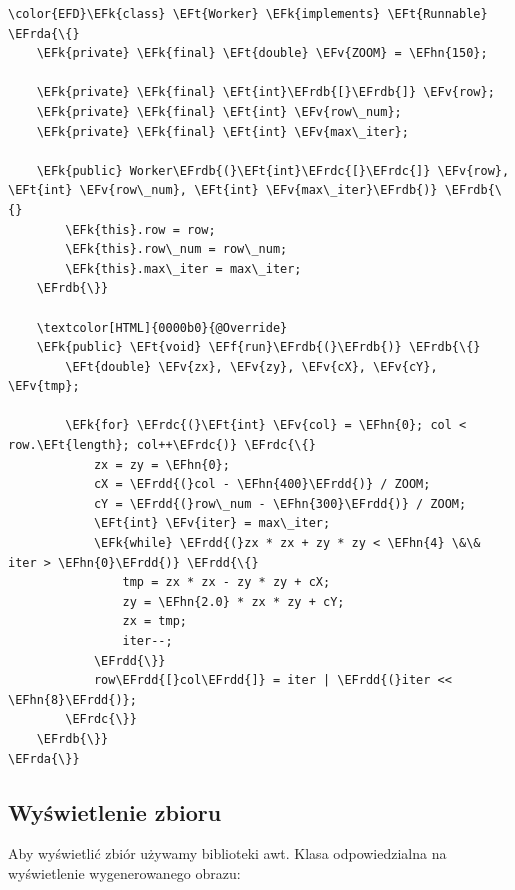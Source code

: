 \documentclass[11pt]{article}
\newcommand{\EFk}[1]{\textcolor{EFk}{#1}} %
\newcommand{\EFf}[1]{\textcolor{EFf}{#1}} %
\newcommand{\EFv}[1]{\textcolor{EFv}{#1}} %
\newcommand{\EFt}[1]{\textcolor{EFt}{#1}} %
\newcommand{\EFhn}[1]{\textcolor{EFhn}{#1}} %
\newcommand{\EFrda}[1]{#1} %
\newcommand{\EFrdb}[1]{\textcolor{EFrdb}{#1}} %
\newcommand{\EFrdc}[1]{\textcolor{EFrdc}{#1}} %
\newcommand{\EFrdd}[1]{\textcolor{EFrdd}{#1}} %
\begin{document}
\begin{Code}
\begin{Verbatim}
\color{EFD}\EFk{class} \EFt{Worker} \EFk{implements} \EFt{Runnable} \EFrda{\{}
    \EFk{private} \EFk{final} \EFt{double} \EFv{ZOOM} = \EFhn{150};

    \EFk{private} \EFk{final} \EFt{int}\EFrdb{[}\EFrdb{]} \EFv{row};
    \EFk{private} \EFk{final} \EFt{int} \EFv{row\_num};
    \EFk{private} \EFk{final} \EFt{int} \EFv{max\_iter};

    \EFk{public} Worker\EFrdb{(}\EFt{int}\EFrdc{[}\EFrdc{]} \EFv{row}, \EFt{int} \EFv{row\_num}, \EFt{int} \EFv{max\_iter}\EFrdb{)} \EFrdb{\{}
        \EFk{this}.row = row;
        \EFk{this}.row\_num = row\_num;
        \EFk{this}.max\_iter = max\_iter;
    \EFrdb{\}}

    \textcolor[HTML]{0000b0}{@Override}
    \EFk{public} \EFt{void} \EFf{run}\EFrdb{(}\EFrdb{)} \EFrdb{\{}
        \EFt{double} \EFv{zx}, \EFv{zy}, \EFv{cX}, \EFv{cY}, \EFv{tmp};

        \EFk{for} \EFrdc{(}\EFt{int} \EFv{col} = \EFhn{0}; col < row.\EFt{length}; col++\EFrdc{)} \EFrdc{\{}
            zx = zy = \EFhn{0};
            cX = \EFrdd{(}col - \EFhn{400}\EFrdd{)} / ZOOM;
            cY = \EFrdd{(}row\_num - \EFhn{300}\EFrdd{)} / ZOOM;
            \EFt{int} \EFv{iter} = max\_iter;
            \EFk{while} \EFrdd{(}zx * zx + zy * zy < \EFhn{4} \&\& iter > \EFhn{0}\EFrdd{)} \EFrdd{\{}
                tmp = zx * zx - zy * zy + cX;
                zy = \EFhn{2.0} * zx * zy + cY;
                zx = tmp;
                iter--;
            \EFrdd{\}}
            row\EFrdd{[}col\EFrdd{]} = iter | \EFrdd{(}iter << \EFhn{8}\EFrdd{)};
        \EFrdc{\}}
    \EFrdb{\}}
\EFrda{\}}
\end{Verbatim}
\end{Code}
\subsection*{Wyświetlenie zbioru}
\label{sec:org98aac2f}
Aby wyświetlić zbiór używamy biblioteki awt.
Klasa odpowiedzialna na wyświetlenie wygenerowanego obrazu:
\end{document}
